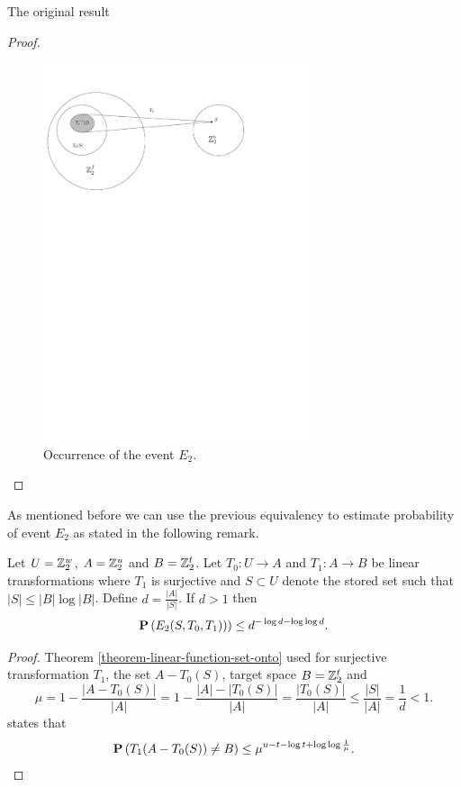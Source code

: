 \begin{section}{The original result}
\begin{proof}
\begin{figure}
  \centering
    \includegraphics[width=0.7\textwidth]{images/e2}

  \caption{Occurrence of the event $E_2$.}
\end{figure}

\end{proof}

As mentioned before we can use the previous equivalency to estimate probability of event $E_2$ as stated in the following remark. 
\begin{remark}
\label{remark-e2-probability}
Let $U = \mathbb{Z}_{2}^{w}$, $A = \mathbb{Z}_{2}^{u}$ and $B = \mathbb{Z}_{2}^{t}$. Let $T_0: U \rightarrow A$ and $T_1: A \rightarrow B$ be linear transformations where $T_1$ is surjective and $S \subset U$ denote the stored set such that $|S| \leq |B| \log |B|$. Define $d = \frac{|A|}{|S|}$. If $d > 1$ then 
\[
	\mathbf{P}\left(E_2(S, T_0, T_1))\right) \leq d^{-\log d - \log \log d} \text{.}
\]
\end{remark}
\begin{proof}
Theorem \ref{theorem-linear-function-set-onto} used for surjective transformation $T_1$, the set $A - T_0(S)$, target space $B = \mathbb{Z}_{2}^{t}$ and \[
	\mu = 1 - \frac{|A - T_0(S)|}{|A|} = 1 - \frac{|A| - |T_0(S)|}{|A|} = \frac{|T_0(S)|}{|A|} \leq \frac{|S|}{|A|} = \frac{1}{d} < 1 \text{.}
\] states that
\[
	\mathbf{P}\left(T_1(A - T_0(S)) \neq B\right) \leq \mu ^ {u - t - \log t + \log \log \frac{1}{\mu}} \text{.}
\]


\end{proof}
\end{section}
